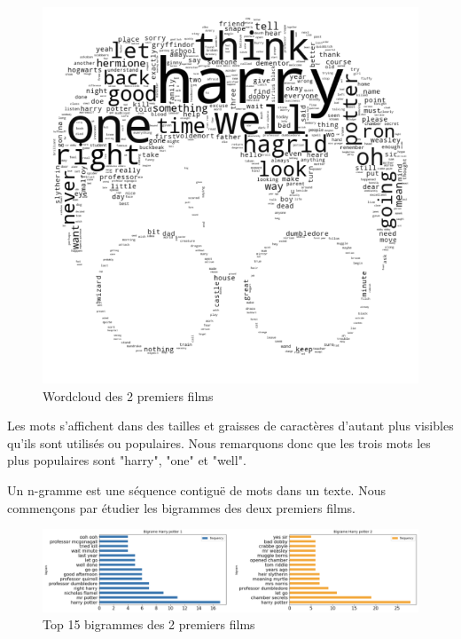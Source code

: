 \documentclass[11pt]{article}
\begin{document}
\begin{figure}[hbt!]
    \includegraphics[width= 16cm]{./figures/wordcloud.png}
    \caption{Wordcloud des 2 premiers films}
\end{figure}
\FloatBarrier

Les mots s'affichent dans des tailles et graisses de caractères d'autant plus visibles qu'ils sont utilisés ou populaires. Nous remarquons donc que les trois mots les plus populaires sont "harry", "one" et "well".\par

Un n-gramme est une séquence contiguë de mots dans un texte. Nous commençons par étudier les bigrammes des deux premiers films.

\begin{figure}[hbt!]
    \includegraphics[width= 16cm, height= 7 cm]{./figures/bigrams.png}
    \caption{Top 15 bigrammes des 2 premiers films}
\end{figure}
\FloatBarrier
\end{document}
